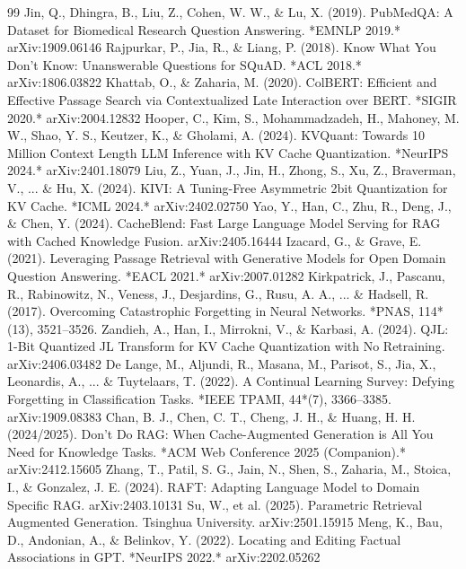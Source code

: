 \documentclass[10pt,twocolumn]{article}
\begin{document}
\begin{thebibliography}{99}
   Jin, Q., Dhingra, B., Liu, Z., Cohen, W. W., \& Lu, X. (2019). PubMedQA: A Dataset for Biomedical Research Question Answering. *EMNLP 2019.* arXiv:1909.06146
   Rajpurkar, P., Jia, R., \& Liang, P. (2018). Know What You Don't Know: Unanswerable Questions for SQuAD. *ACL 2018.* arXiv:1806.03822
   Khattab, O., \& Zaharia, M. (2020). ColBERT: Efficient and Effective Passage Search via Contextualized Late Interaction over BERT. *SIGIR 2020.* arXiv:2004.12832
   Hooper, C., Kim, S., Mohammadzadeh, H., Mahoney, M. W., Shao, Y. S., Keutzer, K., \& Gholami, A. (2024). KVQuant: Towards 10 Million Context Length LLM Inference with KV Cache Quantization. *NeurIPS 2024.* arXiv:2401.18079
   Liu, Z., Yuan, J., Jin, H., Zhong, S., Xu, Z., Braverman, V., ... \& Hu, X. (2024). KIVI: A Tuning-Free Asymmetric 2bit Quantization for KV Cache. *ICML 2024.* arXiv:2402.02750
   Yao, Y., Han, C., Zhu, R., Deng, J., \& Chen, Y. (2024). CacheBlend: Fast Large Language Model Serving for RAG with Cached Knowledge Fusion. arXiv:2405.16444
   Izacard, G., \& Grave, E. (2021). Leveraging Passage Retrieval with Generative Models for Open Domain Question Answering. *EACL 2021.* arXiv:2007.01282
   Kirkpatrick, J., Pascanu, R., Rabinowitz, N., Veness, J., Desjardins, G., Rusu, A. A., ... \& Hadsell, R. (2017). Overcoming Catastrophic Forgetting in Neural Networks. *PNAS, 114*(13), 3521--3526.
   Zandieh, A., Han, I., Mirrokni, V., \& Karbasi, A. (2024). QJL: 1-Bit Quantized JL Transform for KV Cache Quantization with No Retraining. arXiv:2406.03482
   De Lange, M., Aljundi, R., Masana, M., Parisot, S., Jia, X., Leonardis, A., ... \& Tuytelaars, T. (2022). A Continual Learning Survey: Defying Forgetting in Classification Tasks. *IEEE TPAMI, 44*(7), 3366--3385. arXiv:1909.08383
   Chan, B. J., Chen, C. T., Cheng, J. H., \& Huang, H. H. (2024/2025). Don't Do RAG: When Cache-Augmented Generation is All You Need for Knowledge Tasks. *ACM Web Conference 2025 (Companion).* arXiv:2412.15605
   Zhang, T., Patil, S. G., Jain, N., Shen, S., Zaharia, M., Stoica, I., \& Gonzalez, J. E. (2024). RAFT: Adapting Language Model to Domain Specific RAG. arXiv:2403.10131
   Su, W., et al. (2025). Parametric Retrieval Augmented Generation. Tsinghua University. arXiv:2501.15915
   Meng, K., Bau, D., Andonian, A., \& Belinkov, Y. (2022). Locating and Editing Factual Associations in GPT. *NeurIPS 2022.* arXiv:2202.05262

\end{thebibliography}
\end{document}
